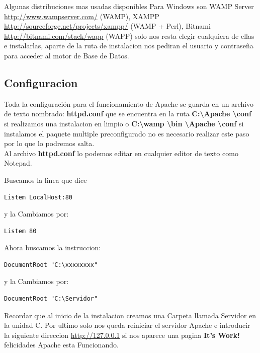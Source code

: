 Algunas distribuciones mas usadas disponibles Para Windows son WAMP Server \url{http://www.wampserver.com/} (WAMP),
XAMPP \url{http://sourceforge.net/projects/xampp/} (WAMP + Perl), Bitnami \url{http://bitnami.com/stack/wapp} (WAPP)
solo nos resta elegir cualquiera de ellas e instalarlas, aparte de la ruta de instalacion nos pediran el usuario y
contraseña para acceder al motor de Base de Datos.

\subsection{Configuracion}

Toda la configuración para el funcionamiento de Apache se guarda en un archivo
de texto nombrado: {\bfseries httpd.conf} que se encuentra en la ruta
{\bfseries C:\textbackslash Apache \textbackslash conf } si realizamos una instalacion en limpio o
{\bfseries C:\textbackslash wamp \textbackslash bin \textbackslash  Apache \textbackslash conf } si
instalamos el paquete multiple preconfigurado no es necesario realizar este paso por lo
que lo podremos salta.\\

Al archivo {\bfseries httpd.conf} lo podemos editar en cualquier editor de texto como Notepad.

Buscamos la linea que dice

\begin{lstlisting}[style=consola, numbers=none]
    Listem LocalHost:80
\end{lstlisting}

y la Cambiamos por:

\begin{lstlisting}[style=consola, numbers=none]
    Listem 80
\end{lstlisting}

Ahora buscamos la instruccion:

\begin{lstlisting}[style=consola, numbers=none]
    DocumentRoot "C:\xxxxxxxx"
\end{lstlisting}

y la Cambiamos por:

\begin{lstlisting}[style=consola, numbers=none]
    DocumentRoot "C:\Servidor"
\end{lstlisting}

Recordar que al inicio de la instalacion creamos una Carpeta llamada Servidor en
la unidad C. Por ultimo solo nos queda reiniciar el servidor Apache e introducir
la siguiente direccion \url{http://127.0.0.1} si nos aparece una pagina
{\bfseries It's Work!} felicidades Apache esta Funcionando.



